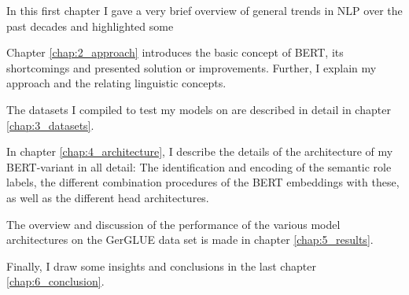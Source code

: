 In this first chapter I gave a very brief overview of general trends in
NLP over the past decades and highlighted some

Chapter \ref{chap:2_approach} introduces the basic concept of BERT,
its {\color{red} shortcomings} and presented solution or improvements. Further,
I explain my approach and the relating linguistic concepts.

The datasets I compiled to test my models on are described in detail
in chapter \ref{chap:3_datasets}.

In chapter \ref{chap:4_architecture}, I describe the details of the architecture of
my BERT-variant in all detail: The identification and encoding of the semantic role
labels, the different combination procedures of the BERT embeddings with these, as
well as the different head architectures.

The overview and discussion of the performance of the various model architectures on
the GerGLUE data set is made in chapter \ref{chap:5_results}.

Finally, I draw some insights and conclusions in the last chapter \ref{chap:6_conclusion}.

